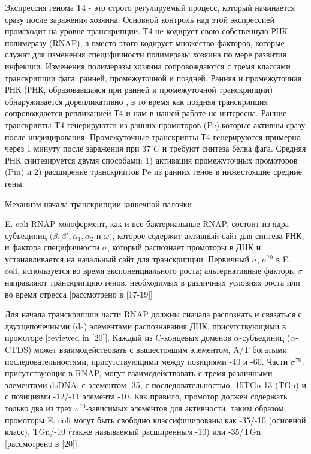 \documentclass[14pt]{extarticle}
\begin{document}
        \par{Экспрессия генома Т4 - это строго регулируемый процесс, который начинается сразу после заражения хозяина. 
        Основной контроль над этой экспрессией происходит на уровне транскрипции. Т4 не кодирует свою собственную 
        РНК-полимеразу (RNAP), а вместо этого кодирует множество факторов, которые служат для изменения специфичности 
        полимеразы хозяина по мере развития инфекции. Изменения полимеразы хозяина сопровождаются с тремя классами 
        транскрипции фага: ранней, промежуточной и поздней. Ранняя и промежуточная РНК (РНК, образовавшаяся при ранней и
        промежуточной транскрипции) обнаруживается дорепликативно 
        \cite{hinton1,hinton2,hinton3,hinton4,hinton5,hinton6}, в то время как поздняя транскрипция сопровождается 
        репликацией Т4 и нам в нашей работе не интересна. Ранние транскрипты T4 генерируются из ранних промоторов 
        (Pe),которые активны сразу после инфицирования. Промежуточные транскрипты Т4 генерируются примерно через 1 
        минуту после заражения при \(37^\circ C\) и требуют синтеза белка фага. Средняя РНК синтезируется двумя 
        способами: 1) активация промежуточных промоторов (Pm) и 2) расширение транскриптов Pe из ранних генов в 
        нижестоящие средние гены.}
        
        \begin{center}
          \item {\Large Механизм начала транскрипции кишечной палочки}
        \end{center}
        
        \par{E. coli RNAP холофермент, как и все бактериальные RNAP, состоит из ядра субъединиц 
        \((\beta,\beta',\alpha_1,\alpha_2\) и \(\omega)\), которое содержит активный сайт для синтеза РНК, и фактора 
        специфичности \(\sigma\), который распознает промоторы в ДНК и устанавливается на начальный сайт для 
        транскрипции. Первичный \(\sigma\), \(\sigma^{70}\) в E. coli, используется во время экспоненциального роста; 
        альтернативные факторы \(\sigma\) направляют транскрипцию генов, необходимых в различных условиях роста или во 
        время стресса [рассмотрено в [17-19]]}
        
        \par{Для начала транскрипции части RNAP должны сначала распознать и связаться с двухцепочечными (ds) элементами 
        распознавания ДНК, присутствующими в промоторе [reviewed in [20]]. Каждый из C-концевых доменов 
        $\alpha$-субъединиц ($\alpha$-CTDS) может взаимодействовать с вышестоящим элементом, A/T богатыми 
        последовательностями, присутствующими между позициями -40 и -60. Части \(\sigma^{70}\), присутствующие в RNAP, 
        могут взаимодействовать с тремя различными элементами dsDNA: с элементом -35, с последовательностью -15TGn-13 
        (TGn) и с позициями -12/-11 элемента -10. Как правило, промотор должен содержать только два из трех 
        \(\sigma^{70}\)-зависимых элементов для активности; таким образом, промоторы E. coli могут быть свободно 
        классифицированы как -35/-10 (основной класс), TGn/-10 (также называемый расширенным -10) или -35/TGn 
        [рассмотрено в [20]].}
        
\end{document}
